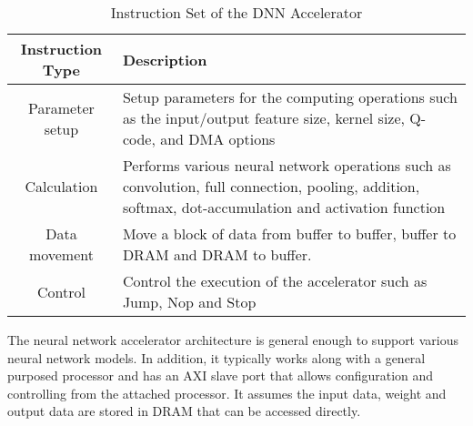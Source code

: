 \begin{table}
    \centering
    \caption{Instruction Set of the DNN Accelerator}
    \label{tab:instrction-set}
    \begin{tabular}{cp{}}
        \toprule
        Instruction Type & Description \\
        \midrule
        Parameter setup & Setup parameters for the computing operations such as the input/output feature size, kernel size, Q-code, and DMA options\\
        \midrule
        Calculation & Performs various neural network operations such as convolution, full connection, pooling, addition, softmax, dot-accumulation and activation function \\
        \midrule
        Data movement & Move a block of data from buffer to buffer, buffer to DRAM and DRAM to buffer.\\
        \midrule
        Control & Control the execution of the accelerator such as Jump, Nop and Stop\\
    \bottomrule
    \end{tabular}
    \vspace{-1em}
\end{table}

The neural network accelerator architecture is general enough to support 
various neural network models. In addition, it typically works along 
with a general purposed processor and has an AXI slave port that allows 
configuration and controlling from the attached processor. It assumes 
the input data, weight and output data are stored in DRAM that can be 
accessed directly.